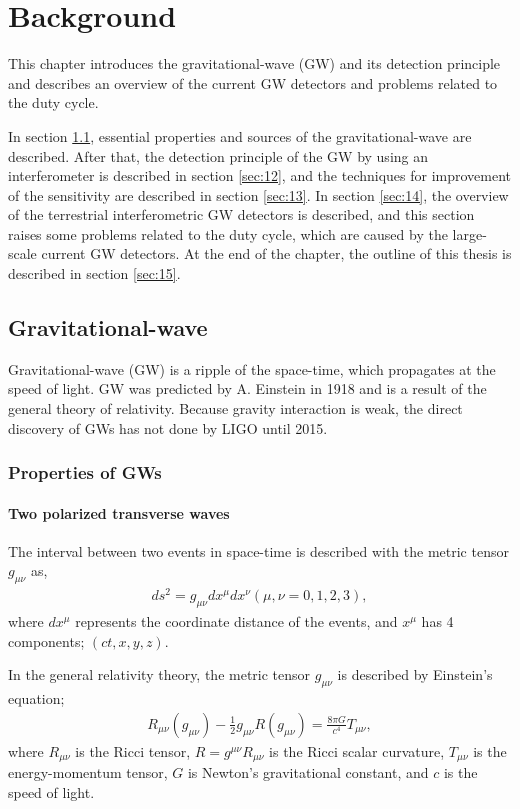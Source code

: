 \chapter{Background} \label{chap1}
This chapter introduces the gravitational-wave (GW) and its detection principle and describes an overview of the current GW detectors and problems related to the duty cycle.

In section \cref{sec:11}, essential properties and sources of the gravitational-wave are described. After that, the detection principle of the GW by using an interferometer is described in section \cref{sec:12}, and the techniques for improvement of the sensitivity are described in section \cref{sec:13}. In section \cref{sec:14}, the overview of the terrestrial interferometric GW detectors is described, and this section raises some problems related to the duty cycle, which are caused by the large-scale current GW detectors. At the end of the chapter, the outline of this thesis is described in section \cref{sec:15}. 

\section{Gravitational-wave} \label{sec:11}
Gravitational-wave (GW) is a ripple of the space-time, which propagates at the speed of light. GW was predicted by A. Einstein in 1918 and is a result of the general theory of relativity. Because gravity interaction is weak, the direct discovery of GWs has not done by LIGO until 2015. 

\subsection{Properties of GWs} 
\subsubsection{Two polarized transverse waves}
The interval between two events in space-time is described with the metric tensor $g_{\mu\nu}$ as, 
\begin{eqnarray}
  d s^{2}=g_{\mu \nu} d x^{\mu} d x^{\nu} (\mu,\nu = 0,1,2,3),
\end{eqnarray}
where $dx^{\mu}$ represents the coordinate distance of the events, and $x^{\mu}$ has 4 components; $(ct,x,y,z)$.

In the general relativity theory\cite{einstein1916vd}, the metric tensor $g_{\mu\nu}$ is described by Einstein's equation;
\begin{eqnarray}
  R_{\mu \nu}\left(g_{\mu \nu}\right)-\frac{1}{2} g_{\mu \nu} R\left(g_{\mu \nu}\right)=\frac{8 \pi G}{c^{4}} T_{\mu \nu},
\end{eqnarray}
where $R_{\mu\nu}$ is the Ricci tensor, $R=g^{\mu \nu} R_{\mu \nu}$ is the Ricci scalar curvature, $T_{\mu\nu}$ is the energy-momentum tensor, $G$ is Newton's gravitational constant, and $c$ is the speed of light.

